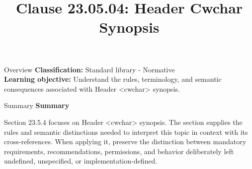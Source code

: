 \documentclass[10pt,letterpaper]{article}
\title{Clause 23.05.04: Header Cwchar Synopsis}
\author{}
\date{}
\begin{document}
\maketitle
\begin{CornellOverviewBox}{Overview}
\textbf{Classification:} Standard library - Normative\\[2pt]
\textbf{Learning objective:} Understand the rules, terminology, and semantic consequences associated with Header <cwchar> synopsis.
\end{CornellOverviewBox}\begin{CornellSummaryBox}{Summary}
{\sffamily\bfseries\color{Accent} Summary}\par\vspace{3pt}Section 23.5.4 focuses on Header <cwchar> synopsis. The section supplies the rules and semantic distinctions needed to interpret this topic in context with its cross-references. When applying it, preserve the distinction between mandatory requirements, recommendations, permissions, and behavior deliberately left undefined, unspecified, or implementation-defined.
\end{CornellSummaryBox}
\end{document}
